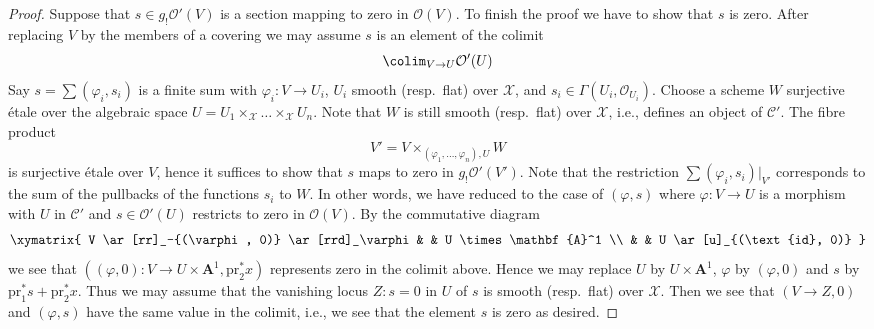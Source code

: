 \begin{proof}
\medskip\noindent
Suppose that $s \in g_!\mathcal{O}'(V)$ is a section
mapping to zero in $\mathcal{O}(V)$. To finish the proof we have to show
that $s$ is zero. After replacing $V$ by the members
of a covering we may assume $s$ is an element of the colimit
$$
\colim_{V \to U} \mathcal{O}'(U)
$$
Say $s = \sum (\varphi_i, s_i)$ is a finite sum with
$\varphi_i : V \to U_i$, $U_i$ smooth (resp.\ flat) over $\mathcal{X}$, and
$s_i \in \Gamma(U_i, \mathcal{O}_{U_i})$. Choose a scheme $W$ surjective
\'etale over the algebraic space
$U = U_1 \times_\mathcal{X} \ldots \times_\mathcal{X} U_n$.
Note that $W$ is still smooth (resp.\ flat) over $\mathcal{X}$, i.e.,
defines an object of $\mathcal{C}'$. The fibre product
$$
V' = V \times_{(\varphi_1, \ldots, \varphi_n), U} W
$$
is surjective \'etale over $V$, hence it suffices to show that $s$ maps
to zero in $g_!\mathcal{O}'(V')$. Note that the restriction
$\sum (\varphi_i, s_i)|_{V'}$ corresponds to the sum of the pullbacks
of the functions $s_i$ to $W$. In other words, we have reduced to the case
of $(\varphi, s)$ where $\varphi : V \to U$ is a morphism with $U$ in
$\mathcal{C}'$ and $s \in \mathcal{O}'(U)$ restricts to zero in
$\mathcal{O}(V)$. By the commutative diagram
$$
\xymatrix{
V \ar[rr]_-{(\varphi, 0)} \ar[rrd]_\varphi & & U \times \mathbf{A}^1 \\
& & U \ar[u]_{(\text{id}, 0)}
}
$$
we see that
$((\varphi, 0) : V \to U \times \mathbf{A}^1, \text{pr}_2^*x)$
represents zero in the colimit above. Hence we may
replace $U$ by $U \times \mathbf{A}^1$, $\varphi$ by $(\varphi, 0)$
and $s$ by $\text{pr}_1^*s + \text{pr}_2^*x$. Thus we may assume that
the vanishing locus $Z : s = 0$ in $U$ of $s$ is smooth (resp.\ flat)
over $\mathcal{X}$. Then we see that $(V \to Z, 0)$ and $(\varphi, s)$
have the same value in the colimit, i.e., we see that the element $s$
is zero as desired.
\end{proof}
